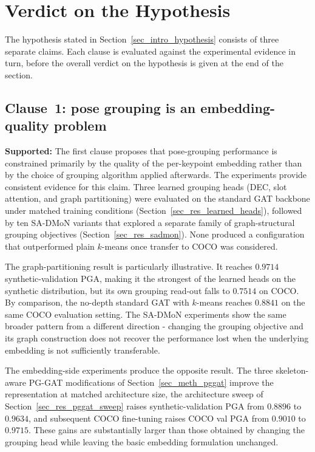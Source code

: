 \section{Verdict on the Hypothesis}
\label{sec_conc_verdict}

The hypothesis stated in Section~\ref{sec_intro_hypothesis} consists of
three separate claims.
Each clause is evaluated against the experimental evidence in turn,
before the overall verdict on the hypothesis is given at the end of the
section.

\subsection{Clause~1: pose grouping is an embedding-quality problem}
\label{sec_conc_verdict_embedding}

\textbf{Supported:}
The first clause proposes that pose-grouping performance is constrained
primarily by the quality of the per-keypoint embedding rather than by the
choice of grouping algorithm applied afterwards.
The experiments provide consistent evidence for this claim.
Three learned grouping heads (DEC,
slot attention,
and graph partitioning) were evaluated on the standard GAT backbone
under matched training conditions (Section~\ref{sec_res_learned_heads}),
followed by ten SA-DMoN variants that explored a separate family of
graph-structural grouping objectives (Section~\ref{sec_res_sadmon}).
None produced a configuration that outperformed plain $k$-means once
transfer to COCO was considered.

The graph-partitioning result is particularly illustrative.
It reaches $0.9714$ synthetic-validation PGA,
making it the strongest of the learned heads on the synthetic
distribution,
but its own grouping read-out falls to $0.7514$ on COCO.
By comparison, the no-depth standard GAT with $k$-means reaches
$0.8841$ on the same COCO evaluation setting.
The SA-DMoN experiments show the same broader pattern from a different
direction -
changing the grouping objective and its graph construction does not
recover the performance lost when the underlying embedding is not
sufficiently transferable.

The embedding-side experiments produce the opposite result.
The three skeleton-aware PG-GAT modifications of
Section~\ref{sec_meth_pggat} improve the representation at matched
architecture size,
the architecture sweep of Section~\ref{sec_res_pggat_sweep} raises
synthetic-validation PGA from $0.8896$ to $0.9634$,
and subsequent COCO fine-tuning raises COCO val PGA from $0.9010$
to $0.9715$.
These gains are substantially larger than those obtained by changing
the grouping head while leaving the basic embedding formulation
unchanged.

